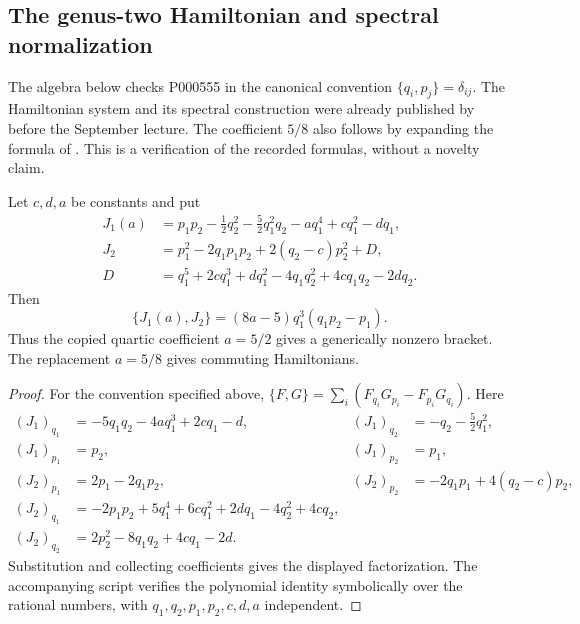 \subsection{The genus-two Hamiltonian and spectral normalization}

The algebra below checks P000555 in the canonical convention \(\{q_i,p_j\}=\delta_{ij}\). The Hamiltonian system and its spectral construction were already published by \citet[\S2, pp.~64--65]{novikov1974periodic} before the September lecture. The coefficient \(5/8\) also follows by expanding the formula of \citet[\S4]{dubrovinnovikov1974periodicity}. This is a verification of the recorded formulas, without a novelty claim.

\begin{proposition}\oursComputed
Let \(c,d,a\) be constants and put
\begin{align*}
 J_1(a)&=p_1p_2-\frac12q_2^2-\frac52q_1^2q_2-aq_1^4+cq_1^2-dq_1,\\
 J_2&=p_1^2-2q_1p_1p_2+2(q_2-c)p_2^2+D,\\
 D&=q_1^5+2cq_1^3+dq_1^2-4q_1q_2^2+4cq_1q_2-2dq_2.
\end{align*}
Then
\[
 \{J_1(a),J_2\}=(8a-5)q_1^3(q_1p_2-p_1).
\]
Thus the copied quartic coefficient \(a=5/2\) gives a generically nonzero bracket. The replacement \(a=5/8\) gives commuting Hamiltonians.
\end{proposition}
\begin{proof}
For the convention specified above,
\(\{F,G\}=\sum_i(F_{q_i}G_{p_i}-F_{p_i}G_{q_i})\).
Here
\begin{align*}
 (J_1)_{q_1}&=-5q_1q_2-4aq_1^3+2cq_1-d,&
 (J_1)_{q_2}&=-q_2-\tfrac52q_1^2,\\
 (J_1)_{p_1}&=p_2,&(J_1)_{p_2}&=p_1,\\
 (J_2)_{p_1}&=2p_1-2q_1p_2,&
 (J_2)_{p_2}&=-2q_1p_1+4(q_2-c)p_2,\\
 (J_2)_{q_1}&=-2p_1p_2+5q_1^4+6cq_1^2+2dq_1-4q_2^2+4cq_2,\\
 (J_2)_{q_2}&=2p_2^2-8q_1q_2+4cq_1-2d.
\end{align*}
Substitution and collecting coefficients gives the displayed factorization. The accompanying script verifies the polynomial identity symbolically over the rational numbers, with \(q_1,q_2,p_1,p_2,c,d,a\) independent.
\end{proof}

